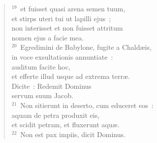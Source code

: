 \begin{flushleft}
\begin{verse}
${}^{19}$~et fuisset quasi arena semen tuum,\\ et stirps uteri tui ut lapilli ejus~;\\ non interisset et non fuisset attritum\\ nomen ejus a facie mea.\\
${}^{20}$~Egredimini de Babylone, fugite a Chald\ae is,\\ in voce exsultationis annuntiate~:\\ auditum facite hoc,\\ et efferte illud usque ad extrema terr\ae .\\ Dicite~: Redemit Dominus\\ servum suum Jacob.\\
${}^{21}$~Non sitierunt in deserto, cum educeret eos~:\\ aquam de petra produxit eis,\\ et scidit petram, et fluxerunt aqu\ae .\\
${}^{22}$~Non est pax impiis, dicit Dominus.\end{verse}\end{flushleft}


